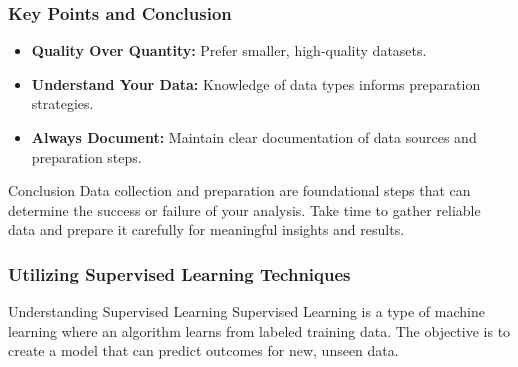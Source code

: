 \documentclass[aspectratio=169]{beamer}
\begin{document}
\begin{frame}[fragile]
  \frametitle{Key Points and Conclusion}
  
  \begin{itemize}
    \item \textbf{Quality Over Quantity:} Prefer smaller, high-quality datasets.
    \item \textbf{Understand Your Data:} Knowledge of data types informs preparation strategies.
    \item \textbf{Always Document:} Maintain clear documentation of data sources and preparation steps.
  \end{itemize}

  \begin{block}{Conclusion}
    Data collection and preparation are foundational steps that can determine the success 
    or failure of your analysis. Take time to gather reliable data and prepare it carefully 
    for meaningful insights and results.
  \end{block}
\end{frame}

\begin{frame}[fragile]
  \frametitle{Utilizing Supervised Learning Techniques}
  \begin{block}{Understanding Supervised Learning}
    Supervised Learning is a type of machine learning where an algorithm learns from labeled training data. The objective is to create a model that can predict outcomes for new, unseen data.
  \end{block}
\end{frame}
\end{document}

